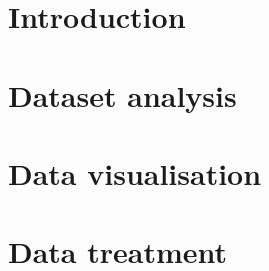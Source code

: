 \documentclass{article}
\begin{document}
\section{Introduction} %

\section{Dataset analysis}

\section{Data visualisation}

\section{Data treatment}
\end{document}

